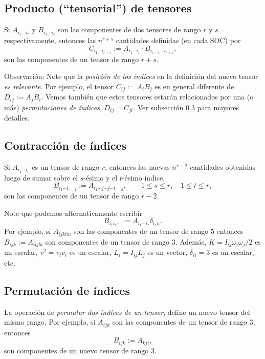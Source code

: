 \subsection{Producto (``tensorial'') de tensores}

Si $A_{i_1\cdots i_r}$ y $B_{i_1\cdots i_s}$ son las componentes de dos tensores de rango $r$ y $s$ respectivamente, entonces las $n^{r+s}$ cantidades definidas (en cada SOC) por
\begin{equation}
C_{i_1\cdots i_{r+s}}:=A_{i_1\cdots i_r}\cdot B_{i_{r+1}\cdots i_{r+s}},
\end{equation}
son las componentes de un tensor de rango $r+s$.

Observación: Note que la \textit{posición de los índices} en la definición del nuevo tensor \textit{es relevante}. Por ejemplo, el tensor $C_{ij}:=A_iB_j$ es en general diferente de $D_{ij}:=A_jB_i$. Vemos también que estos tensores estarán relacionados por una (o más) \textit{permutaciones de índices}, $D_{ij}=C_{ji}$. Ver subsección \ref{sec:permu} para mayores detalles.

\subsection{Contracción de índices}
Si $A_{i_1\cdots i_r}$ es un tensor de rango $r$, entonces las nuevas $n^{r-2}$ cantidades obtenidas luego de sumar sobre el $s$-ésimo y el $t$-ésimo índice,
\begin{equation}
B_{i_1\cdots i_{r-2}}:=A_{i_1\cdots j\cdots j\cdots i_{r-2}}, \qquad 1\le s\le r, \quad 1\le t\le r,
\end{equation}
son las componentes de un tensor de rango $r-2$.

Note que podemos alternativamente escribir
\begin{equation}
B_{i_1i_2\cdots}:=A_{i_1\cdots i_r}\delta_{i_{s}i_{t}}.
\end{equation}
Por ejemplo, si $A_{ijklm}$ son las componentes de un tensor de rango $5$ entonces $B_{ijk}:=A_{iljlk}$ son componentes de un tensor de rango $3$. Además, $K=I_{ij}\omega_i\omega_j/2$ es un escalar, $v^2=v_iv_i$ es un escalar, $L_i=I_{ij}L_j$ es un vector, $\delta_{ii}=3$ es un escalar, etc.

\subsection{Permutación de índices}\label{sec:permu}
La operación de \textit{permutar dos índices de un tensor}, define un nuevo tensor del mismo rango. Por ejemplo, si $A_{ijk}$ son las componentes de un tensor de rango $3$, entonces
\begin{equation}
B_{ijk}:=A_{kji},
\end{equation}
son componentes de un nuevo tensor de rango 3.

